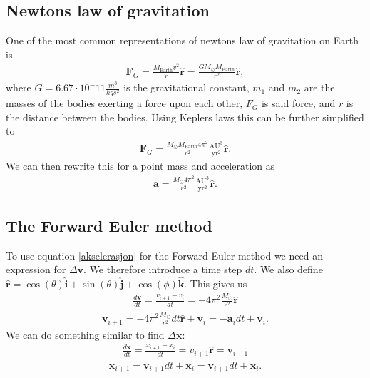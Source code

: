 \documentclass[a4paper]{article}
\begin{document}
\subsection{Newtons law of gravitation}
One of the most common representations of newtons law of gravitation on Earth is
\begin{align}
\boldsymbol{F}_{G} = \frac{M_{\text{Earth}}v^{2}}{r}\boldsymbol{\hat{r}} = \frac{GM_{\odot} M_{\text{Earth}}}{r^{2}}\boldsymbol{\hat{r}},
\end{align}
where $G=6.67\cdot10^-11\frac{m^3}{kgs^2}$ is the gravitational constant, $m_1$ and $m_2$ are the masses of the bodies exerting a force upon each other, $F_G$ is said force, and $r$ is the distance between the bodies. Using Keplers laws this can be further simplified to
\begin{align}
\boldsymbol{F}_G=\frac{{M_{\odot}M_\text{Earth}}4\pi^{2}}{r^{2}}\frac{\mathrm{AU}^{3}}{\mathrm{yr}^{2}}\boldsymbol{\hat{r}}.
\end{align}
We can then rewrite this for a point mass and acceleration as
\begin{align}
\boldsymbol{a}=\frac{{M_{\odot}}4\pi^{2}}{r^{2}}\frac{\mathrm{AU}^{3}}{\mathrm{yr}^{2}}\boldsymbol{\hat{r}}. \label{akselerasjon}
\end{align} 

\subsection{The Forward Euler method}
To use equation \ref{akselerasjon} for the Forward Euler method we need an expression for $\Delta \boldsymbol{v}$. We therefore introduce a time step $dt$. We also define $\boldsymbol{\hat{r}}=\cos(\theta)\boldsymbol{\hat{i}}+\sin(\theta)\boldsymbol{\hat{j}}+\cos(\phi)\boldsymbol{\hat{k}}$. This gives us
\begin{align*}
\frac{d\boldsymbol{v}}{dt}=\frac{v_{i+1}-v_i}{dt}=-4\pi^2\frac{M_{\odot}}{r^2}\boldsymbol{\hat{r}}
\end{align*}
\begin{align}
\boldsymbol{v}_{i+1}=-4\pi^2\frac{M_\odot}{r^2}dt\boldsymbol{\hat{r}} + \boldsymbol{v}_i 
= -\boldsymbol{a}_i dt  + \boldsymbol{v}_i.
\end{align}
We can do something similar to find $\Delta \boldsymbol{x}$:
\begin{align*}
\frac{d\boldsymbol{x}}{dt}=\frac{x_{i+1}-x_i}{dt} = v_{i+1}\boldsymbol{\hat{r}} = \boldsymbol{v}_{i+1}
\end{align*}
\begin{align}
\boldsymbol{x}_{i+1}= \boldsymbol{v}_{i+1}dt + \boldsymbol{x}_i 
= \boldsymbol{v}_{i+1} dt  + \boldsymbol{x}_i.
\end{align}
\end{document}
